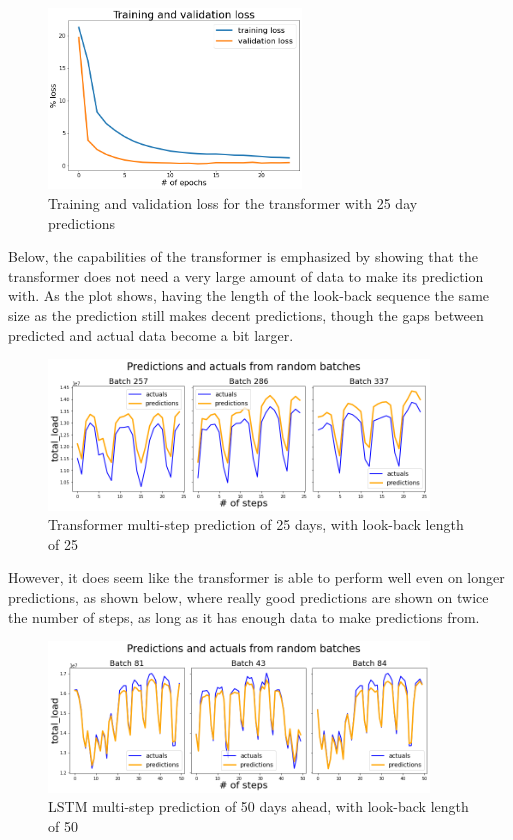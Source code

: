 \documentclass[main.tex]{subfiles}
\begin{document}
\begin{figure}[H]
    \centering
    \includegraphics[width=0.6\textwidth]{TransformerPlots/transformerlossgood.png}
    \caption{Training and validation loss for the transformer with 25 day predictions}
    \label{fig:transformer_loss}
\end{figure}

Below, the capabilities of the transformer is emphasized by showing that the transformer does not need a very large amount of data to make its prediction with. As the plot shows, having the length of the look-back sequence the same size as the prediction still makes decent predictions, though the gaps between predicted and actual data become a bit larger.

\begin{figure}[H]
    \centering
    \includegraphics[width=0.9\textwidth]{TransformerPlots/transformerpredictionsnotasgood.png}
    \caption{Transformer multi-step prediction of 25 days, with look-back length of 25}
    \label{fig:transformer_pred_2}
\end{figure}

However, it does seem like the transformer is able to perform well even on longer predictions, as shown below, where really good predictions are shown on twice the number of steps, as long as it has enough data to make predictions from.

\begin{figure}[H]
\centering
\includegraphics[width=0.9\textwidth]{TransformerPlots/transformerpredictionsgood3.png}
\caption{LSTM multi-step prediction of 50 days ahead, with look-back length of 50}
\label{fig:lstm_preds_1}
\end{figure}
\end{document}
